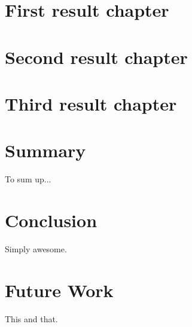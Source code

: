 \myclearpage{}
\chapter{First result chapter}
\label{chap:reschap1}
 

\myclearpage{}
\chapter{Second result chapter}
\label{chap:reschap2}
 

\myclearpage{}
\chapter{Third result chapter}
\label{chap:reschap3}
 

\newpage\myclearpage{}
\chapter{Summary}
\label{chap:summary}
% 
To sum up...

\newpage\myclearpage{}
\chapter{Conclusion}
\label{chap:conclusion}
%
Simply awesome.


\newpage\myclearpage{}
\chapter{Future Work}
\label{chap:future_work}
%
This and that.

\myclearpage


